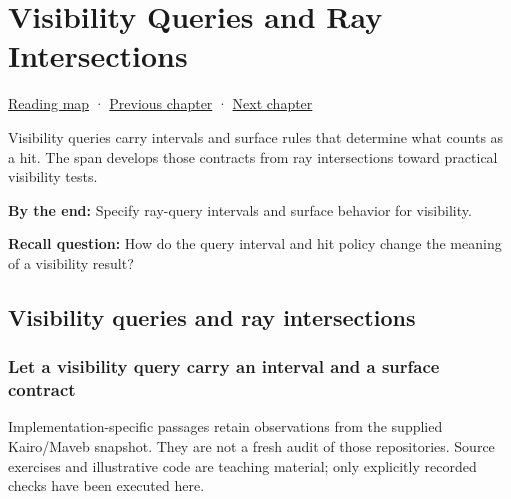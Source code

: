 \chapter{Visibility Queries and Ray Intersections}\label{04-visual-computing-ii-ch028-visibility-queries-and-ray-intersections}\hypertarget{04-visual-computing-ii-ch028}{}\label{stagechapter:04-visual-computing-ii-ch028}

\hypertarget{04-visual-computing-ii-ch028-visibility-queries-and-ray-intersections}{}

\hyperref[volume-reading-map]{Reading map} · \hyperref[04-visual-computing-ii-ch027-mesh-queries-classification-and-clipping]{Previous chapter} · \hyperref[04-visual-computing-ii-ch029-acceleration-structures-and-robust-queries]{Next chapter}

Visibility queries carry intervals and surface rules that determine what counts as a hit. The span develops those contracts from ray intersections toward practical visibility tests.

\textbf{By the end:} Specify ray-query intervals and surface behavior for visibility.

\textbf{Recall question:} How do the query interval and hit policy change the meaning of a visibility result?

\section{Visibility queries and ray intersections}\label{04-visual-computing-ii-ch028-visibility-queries-and-ray-intersections-1}

\hypertarget{04-visual-computing-ii-ch028-visibility-queries-and-ray-intersections-1}{}

\subsection{Let a visibility query carry an interval and a surface contract}\label{04-visual-computing-ii-ch028-let-a-visibility-query-carry-an-interval-and-a-surface-contract}

\hypertarget{04-visual-computing-ii-ch028-let-a-visibility-query-carry-an-interval-and-a-surface-contract}{}

Implementation-specific passages retain observations from the supplied Kairo/Maveb snapshot. They are not a fresh audit of those repositories. Source exercises and illustrative code are teaching material; only explicitly recorded checks have been executed here.


